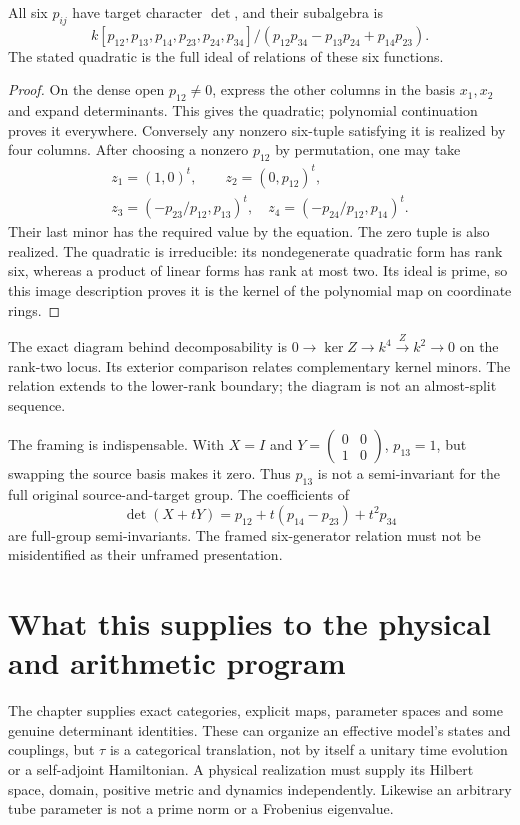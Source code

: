 \begin{theorem}\label{arb:plucker}
All six $p_{ij}$ have target character $\det$, and their subalgebra is
\[
 k[p_{12},p_{13},p_{14},p_{23},p_{24},p_{34}]
 \big/(p_{12}p_{34}-p_{13}p_{24}+p_{14}p_{23}).
\]
The stated quadratic is the full ideal of relations of these six functions.
\end{theorem}
\begin{proof}
On the dense open $p_{12}\ne0$, express the other columns in the basis
$x_1,x_2$ and expand determinants. This gives the quadratic; polynomial
continuation proves it everywhere. Conversely any nonzero six-tuple
satisfying it is realized by four columns. After choosing a nonzero $p_{12}$
by permutation, one may take
\[
\begin{gathered}
 z_1=(1,0)^t,\qquad z_2=(0,p_{12})^t,\\
 z_3=(-p_{23}/p_{12},p_{13})^t,\quad
 z_4=(-p_{24}/p_{12},p_{14})^t.
\end{gathered}
\]
Their last minor has the required value by the equation. The zero tuple is
also realized. The quadratic is irreducible: its nondegenerate quadratic
form has rank six, whereas a product of linear forms has rank at most two.
Its ideal is prime, so this image description proves it is the kernel of
the polynomial map on coordinate rings.
\end{proof}
The exact diagram behind decomposability is
$0\to\ker Z\to k^4\xrightarrow Z k^2\to0$ on the rank-two locus. Its
exterior comparison relates complementary kernel minors. The relation extends
to the lower-rank boundary; the diagram is not an almost-split sequence.

The framing is indispensable. With $X=I$ and
$Y=\left(\begin{smallmatrix}0&0\\1&0\end{smallmatrix}\right)$,
$p_{13}=1$, but swapping the source basis makes it zero. Thus $p_{13}$ is
not a semi-invariant for the full original source-and-target group.
The coefficients of
\[
 \det(X+tY)=p_{12}+t(p_{14}-p_{23})+t^2p_{34}
\]
are full-group semi-invariants. The framed six-generator relation must not be
misidentified as their unframed presentation.

\section[Physical and arithmetic scope]{What this supplies to the physical and arithmetic program}
The chapter supplies exact categories, explicit maps, parameter spaces and
some genuine determinant identities. These can organize an effective model's
states and couplings, but $\tau$ is a categorical translation, not by itself
a unitary time evolution or a self-adjoint Hamiltonian. A physical realization
must supply its Hilbert space, domain, positive metric and dynamics independently.
Likewise an arbitrary tube parameter is not a prime norm or a Frobenius eigenvalue.

